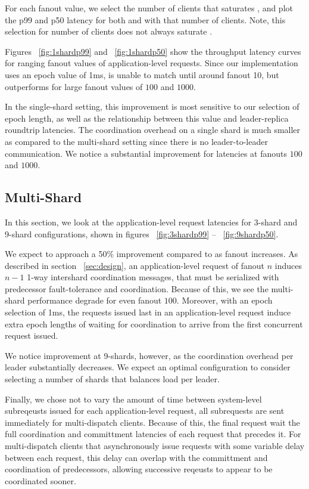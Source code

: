 For each fanout value, we select the number of clients that saturates \system, and plot the p99 and p50 latency for both \system and \mpaxos with that number of clients. Note, this selection for number of clients does not always saturate \mpaxos.

Figures ~\ref{fig:1shardp99} and ~\ref{fig:1shardp50} show the throughput latency curves for ranging fanout values of application-level requests. Since our implementation uses an epoch value of 1ms, \system is unable to match \mpaxos until around fanout 10, but outperforms for large fanout values of $100$ and $1000$.

In the single-shard setting, this improvement is most sensitive to our selection of epoch length, as well as the relationship between this value and leader-replica roundtrip latencies. 
The coordination overhead on a single shard is much smaller as compared to the multi-shard setting since there is no leader-to-leader communication. We notice a substantial improvement for latencies at fanouts $100$ and $1000$.

\subsection{Multi-Shard}
\label{sec:shards}
In this section, we look at the application-level request latencies for 3-shard and 9-shard configurations, shown in figures ~\ref{fig:3shardp99} -- ~\ref{fig:9shardp50}.

We expect \system to approach a 50\% improvement compared to \mpaxos as fanout increases.
As described in section ~\ref{sec:design}, an application-level request of fanout $n$ induces $n-1$ 1-way intershard coordination messages, that must be serialized with predecessor fault-tolerance and coordination.
Because of this, we see the multi-shard performance degrade for even fanout $100$. 
Moreover, with an epoch selection of 1ms, the requests issued last in an application-level request induce extra epoch lengths of waiting for coordination to arrive from the first concurrent request issued.

We notice improvement at 9-shards, however, as the coordination overhead per leader substantially decreases. We expect an optimal configuration to consider selecting a number of shards that balances load per leader.

Finally, we chose not to vary the amount of time between system-level subreqeusts issued for each application-level request, all subrequests are sent immediately for multi-dispatch clients. Because of this, the final request wait the full coordination and committment latencies of each request that precedes it. For multi-dispatch clients that asynchronously issue requests with some variable delay between each request, this delay can overlap with the committment and coordination of predecessors, allowing successive reqeusts to appear to be coordinated sooner.


